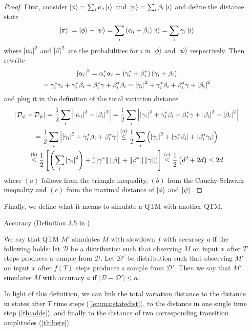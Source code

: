 \begin{lemma}
\begin{proof}
First, consider $\ket{\phi}=\sum_i\alpha_i\ket{i}$ and $\ket{\psi}=\sum_i\beta_i\ket{i}$ and 
define the distance state
\begin{equation}
    \ket{\pi}
    :=\ket{\phi}-\ket{\psi}
    =\sum_i\left(\alpha_i-\beta_i\right)\ket{i}
    =\sum_i\gamma_i\ket{i}
\end{equation}
where $\left\vert\alpha_i\right\vert^2$ and $\left\vert\beta\right\vert^2$ are the probabilities for $i$ in $\ket{\phi}$ and $\ket{\psi}$ respectively.
Then rewrite
\begin{multline}
    \left\vert\alpha_i\right\vert^2
    =\alpha^*_i\alpha_i
    =\left(\gamma^*_i+\beta^*_i\right)\left(\gamma_i+\beta_i\right)
    \\
    =\gamma^*_i\gamma_i+\gamma^*_i\beta_i+\beta^*_i\gamma+\beta^*_i\beta_i
    =\left\vert\gamma_i\right\vert^2+\gamma^*_i\beta_i+\beta^*_i\gamma+\left\vert\beta_i\right\vert^2
\end{multline}
and plug it in the definition of the total variation distance
\begin{multline}
    \left\vert\mathcal{D}_\phi-\mathcal{D}_\psi\right\vert
    =\frac{1}{2}\sum_i\left\vert\left\vert\alpha_i\right\vert^2-\left\vert\beta_i\right\vert^2\right\vert
    =\frac{1}{2}\sum_i\left\vert\left\vert\gamma_i\right\vert^2+\gamma^*_i\beta_i+\beta^*_i\gamma+\left\vert\beta_i\right\vert^2-\left\vert\beta_i\right\vert^2\right\vert
    \\
    =\frac{1}{2}\sum_i\left\vert\left\vert\gamma_i\right\vert^2+\gamma^*_i\beta_i+\beta^*_i\gamma\right\vert
    \overset{(a)}{\leq}\frac{1}{2}\sum_i\left(\left\vert\gamma_i\right\vert^2+\left\vert\gamma^*_i\beta_i\right\vert+\left\vert\beta^*_i\gamma_i\right\vert\right)
    \\
    \overset{(b)}{\leq}\frac{1}{2}\left[\left(\sum_i\left\vert\gamma_i\right\vert^2\right)+\left(\left\lVert\gamma^*\right\rVert\left\lVert\beta\right\rVert+\left\lVert\beta^*\right\rVert\left\lVert\gamma\right\rVert\right)\right]
    \overset{(c)}{\leq}\frac{1}{2}\left(d^2+2d\right)
    \leq 2d
\end{multline}
where $(a)$ follows from the triangle inequality, $(b)$ from the Cauchy-Schwarz inequality and $(c)$ from the maximal distance of $\ket{\phi}$ and $\ket{\psi}$.
\end{proof}
\end{lemma}

Finally, we define what it means to simulate a \ac{QTM} with another \ac{QTM}.
\begin{definition}
Accuracy (Definition 3.5 in \cite{bernstein_vazirani_1997})

We say that \ac{QTM} $M'$ simulates $M$ with slowdown $f$ with accuracy $a$ if the following holds: let $\mathcal{D}$ be a distribution such that observing $M$ on input $x$ after $T$ steps produces a sample from $\mathcal{D}$. Let $\mathcal{D}'$ be distribution such that observing $M'$ on input $x$ after $f(T)$ steps produces a sample from $\mathcal{D}'$. Then we say that $M'$ simulates $M$ with accuracy $a$ if $\vert\mathcal{D}-\mathcal{D}'\vert\leq a$.
\end{definition}
In light of this definition, we can link the total variation distance to the distance in states after $T$ time steps (\cref{lemma:statedist}), to the distance in one single time step (\cref{th:adde}), and finally to the distance of two corresponding transition amplitudes (\cref{th:bete}).

